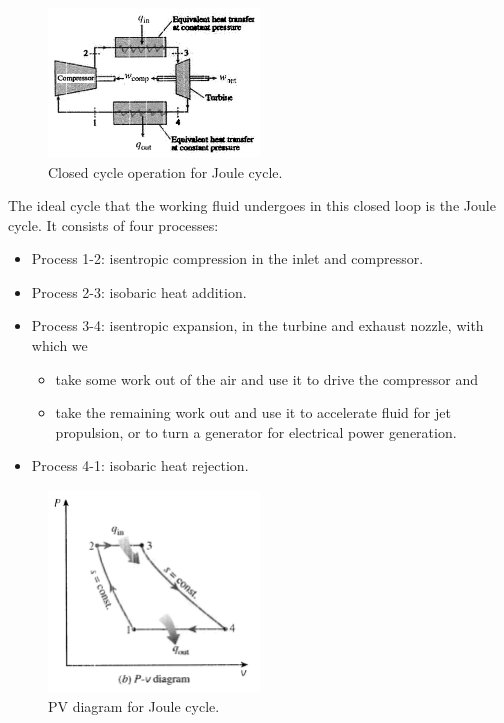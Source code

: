 \documentclass[class=report, crop=false, 12pt,a4paper]{standalone}
\begin{document}
\begin{figure}
  \centering
  \includegraphics[width = 0.5\textwidth]{../img/Brayton3}
  \caption{Closed cycle operation for Joule cycle.}
  \label{brayton3}
\end{figure}
The ideal cycle that the working fluid undergoes in this closed loop is the Joule cycle. It consists of four processes:
\begin{itemize}[noitemsep]
  \item Process 1-2: isentropic compression in the inlet and compressor.
  \item Process 2-3: isobaric heat addition.
  \item Process 3-4: isentropic expansion, in the turbine and exhaust nozzle, with which we
    \begin{itemize}[noitemsep]
      \item take some work out of the air and use it to drive the compressor and
      \item take the remaining work out and use it to accelerate fluid for jet propulsion, or to turn a generator for electrical power generation.
    \end{itemize}
  \item Process 4-1: isobaric heat rejection.
\end{itemize}
\begin{figure}
  \centering
  \includegraphics[width = 0.5\textwidth]{../img/BraytonPV}
  \caption{PV diagram for Joule cycle.}
\end{figure}
\end{document}

